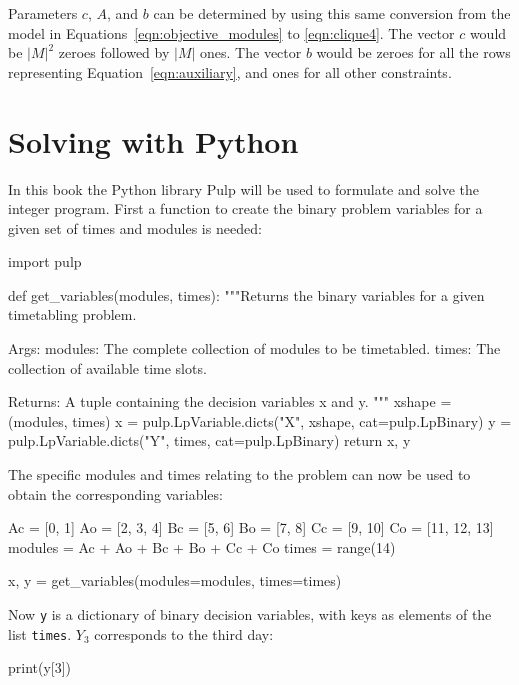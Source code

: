 Parameters \(c\), \(A\), and \(b\) can be determined by using this same conversion
from the model in Equations~\ref{eqn:objective_modules} to \ref{eqn:clique4}.
The vector \(c\) would be \(|M|^2\) zeroes followed by \(|M|\) ones.
The vector \(b\) would be zeroes for all the rows representing
Equation~\ref{eqn:auxiliary}, and ones for all other constraints.

\section{Solving with Python}\label{sec:linear_programming_solving-with-python}

In this book the Python library Pulp will be used to
formulate and solve the integer program. First a function to create the
binary problem variables for a given set of times and modules is needed:

\begin{pyin}
import pulp


def get_variables(modules, times):
    """Returns the binary variables for a given timetabling
    problem.

    Args:
        modules: The complete collection of modules to be
                 timetabled.
        times: The collection of available time slots.

    Returns:
        A tuple containing the decision variables x and y.
    """
    xshape = (modules, times)
    x = pulp.LpVariable.dicts("X", xshape, cat=pulp.LpBinary)
    y = pulp.LpVariable.dicts("Y", times, cat=pulp.LpBinary)
    return x, y
\end{pyin}

The specific modules and times relating to the problem can now be used to
obtain the corresponding variables:

\begin{pyin}
Ac = [0, 1]
Ao = [2, 3, 4]
Bc = [5, 6]
Bo = [7, 8]
Cc = [9, 10]
Co = [11, 12, 13]
modules = Ac + Ao + Bc + Bo + Cc + Co
times = range(14)

x, y = get_variables(modules=modules, times=times)
\end{pyin}

Now \texttt{y} is a dictionary of binary decision variables, with
keys as elements of the list \texttt{times}. \(Y_3\) corresponds to
the third day:

\begin{pyin}
print(y[3])
\end{pyin}

